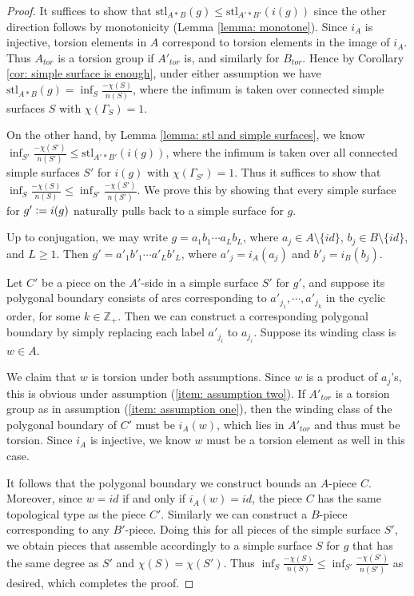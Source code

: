 \documentclass{amsart}
\theoremstyle{definition}
\numberwithin{equation}{section}
\theoremstyle{theorem}
\theoremstyle{remark}
\def\Z{\mathbb Z}
\def\stl{\mathrm{stl}}
\def\defeq{\vcentcolon=}
\begin{document}
	\begin{proof}
		It suffices to show that $\stl_{A*B}(g)\le\stl_{A'*B'}(i(g))$ since the other direction follows by monotonicity (Lemma \ref{lemma: monotone}). 
		Since $i_A$ is injective, torsion elements in $A$ correspond to torsion elements in the image of $i_A$.
		Thus $A_{tor}$ is a torsion group if $A'_{tor}$ is, and similarly for $B_{tor}$.
		Hence by Corollary \ref{cor: simple surface is enough}, under either assumption we have $\stl_{A*B}(g)=\inf_{S} \frac{-\chi(S)}{n(S)}$,
		where the infimum is taken over connected simple surfaces $S$ with $\chi(\Gamma_S)=1$. 
		
		On the other hand, by Lemma \ref{lemma: stl and simple surfaces}, we know $\inf_{S'} \frac{-\chi(S')}{n(S')}\le \stl_{A'*B'}(i(g))$, where the infimum is taken over all connected simple surfaces $S'$ for $i(g)$ with $\chi(\Gamma_{S'})=1$.
		Thus it suffices to show that $\inf_{S} \frac{-\chi(S)}{n(S)}\le \inf_{S'} \frac{-\chi(S')}{n(S')}$.
		We prove this by showing that every simple surface for $g'\defeq i(g)$ naturally pulls back to a simple surface for $g$.
		
		Up to conjugation, we may write $g=a_1b_1\cdots a_L b_L$, where $a_j\in A\setminus\{id\}$, $b_j\in B\setminus\{id\}$, and $L\ge1$. Then $g'=a'_1b'_1\cdots a'_L b'_L$, where $a'_j=i_A(a_j)$ and $b'_j=i_B(b_j)$.
		
		Let $C'$ be a piece on the $A'$-side in a simple surface $S'$ for $g'$, and suppose its polygonal boundary consists of arcs corresponding to $a'_{j_1}, \cdots, a'_{j_k}$ in the cyclic order, for some $k\in\Z_+$. Then we can construct a corresponding polygonal boundary by simply replacing each label $a'_{j_i}$ to $a_{j_i}$. Suppose its winding class is $w\in A$. 
		
		We claim that $w$ is torsion under both assumptions. Since $w$ is a product of $a_j$'s, this is obvious under assumption (\ref{item: assumption two}). If $A'_{tor}$ is a torsion group as in assumption (\ref{item: assumption one}), then the winding class of the polygonal boundary of $C'$ must be $i_A(w)$, which lies in $A'_{tor}$ and thus must be torsion. Since $i_A$ is injective, we know $w$ must be a torsion element as well in this case.
		
		It follows that the polygonal boundary we construct bounds an $A$-piece $C$. Moreover, since $w=id$ if and only if $i_A(w)=id$, the piece $C$ has the same topological type as the piece $C'$. Similarly we can construct a $B$-piece corresponding to any $B'$-piece. Doing this for all pieces of the simple surface $S'$, we obtain pieces that assemble accordingly to a simple surface $S$ for $g$ that has the same degree as $S'$ and $\chi(S)=\chi(S')$. Thus
		$\inf_{S} \frac{-\chi(S)}{n(S)}\le \inf_{S'} \frac{-\chi(S')}{n(S')}$ as desired, which completes the proof.
	\end{proof}
	
\end{document}
